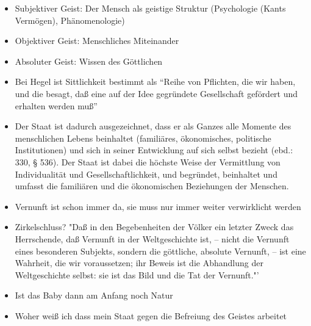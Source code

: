 \documentclass[emulatestandardclasses]{scrartcl}
\begin{document}
\begin{itemize}
  \item Subjektiver Geist: Der Mensch als geistige Struktur (Psychologie (Kants Vermögen), Phänomenologie)
  \item Objektiver Geist: Menschliches Miteinander
  \item Absoluter Geist: Wissen des Göttlichen
  \item Bei Hegel ist Sittlichkeit bestimmt als "`Reihe von Pflichten, die wir haben, und die besagt, daß eine auf der Idee gegründete Gesellschaft gefördert und erhalten werden muß"'
  \item Der Staat ist dadurch ausgezeichnet, dass er als Ganzes alle Momente des menschlichen Lebens beinhaltet (familiäres, ökonomisches, politische Institutionen) und sich in seiner Entwicklung auf sich selbst bezieht (ebd.: 330, § 536). Der Staat ist dabei die höchste Weise der Vermittlung von Individualität und Gesellschaftlichkeit, und begründet, beinhaltet und umfasst die familiären und die ökonomischen Beziehungen der Menschen. 
  \item Vernunft ist schon immer da, sie muss nur immer weiter verwirklicht werden
  \item Zirkelschluss? "Daß in den Begebenheiten der Völker ein letzter Zweck das Herrschende, daß Vernunft in der Weltgeschichte ist, – nicht die Vernunft eines besonderen Subjekts, sondern die göttliche, absolute Vernunft, – ist eine Wahrheit, die wir voraussetzen; ihr Beweis ist die Abhandlung der Weltgeschichte selbst: sie ist das Bild und die Tat der Vernunft."'
  \item Ist das Baby dann am Anfang noch Natur
  \item Woher weiß ich dass mein Staat gegen die Befreiung des Geistes arbeitet
\end{itemize}

%
%
%
%


\end{document}
